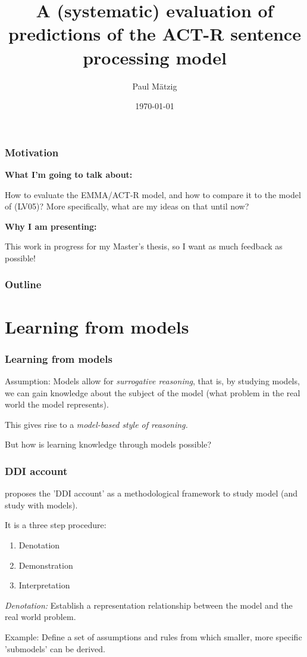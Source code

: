 \documentclass{beamer}
\title{A (systematic) evaluation of predictions of the ACT-R sentence processing model}
\author{Paul M\"{a}tzig}
\date{\today}
\begin{document}
\begin{frame}
  \maketitle
\end{frame}

\begin{frame}
  \frametitle{Motivation}

  \textbf{What I'm going to talk about:}

  How to evaluate the \citep[cf.][]{Engelmann2013} EMMA/ACT-R model, and how to compare it to the model of
  \cite{LV05} (LV05)? More specifically, what are my ideas on that until now?
  
  \textbf{Why I am presenting:}

  This work in progress for my Master's thesis, so I want as much feedback as possible!
  
\end{frame}

\begin{frame}
  \frametitle{Outline}
  \tableofcontents
\end{frame}

\section{Learning from models}

\begin{frame}
  \frametitle{Learning from models}

  Assumption: Models allow for \emph{surrogative reasoning}, that is, by studying models, we can gain knowledge
  about the subject of the model (what problem in the real world the model represents).

  This gives rise to a \emph{model-based style of reasoning.}

  But how is learning knowledge through models possible?
\end{frame}

\begin{frame}
  \frametitle{DDI account}

  \cite{Hughes1997} proposes the 'DDI account' as a methodological framework to study model (and study with models).

  It is a three step procedure:

  \begin{enumerate}
    \item Denotation
    \item Demonstration
    \item Interpretation
  \end{enumerate}

  \emph{Denotation:} Establish a representation relationship between the model and the real world problem.

  Example: Define a set of assumptions and rules from which smaller, more specific 'submodels' can be derived.

\end{frame}
\end{document}
